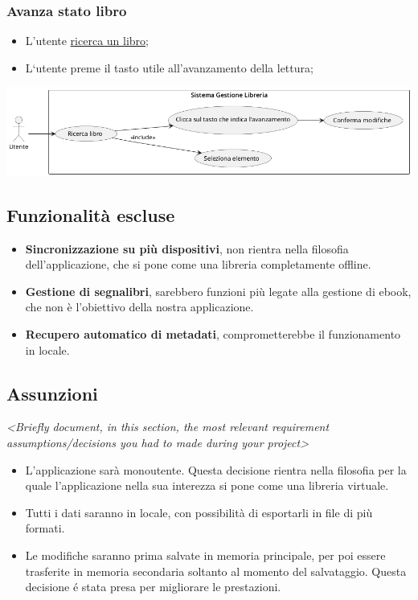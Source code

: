 \subsubsection{Avanza stato libro}
\begin{itemize}
  \item
    L'utente \underline{ricerca un libro};
  \item
    L`utente preme il tasto utile all'avanzamento della lettura;
\end{itemize}
\begin{center}
  \includegraphics[width=\textwidth]{media/useCase6.png}
\end{center}

\subsection{Funzionalità escluse}

\begin{itemize}
  \item
    \textbf{Sincronizzazione su più dispositivi}, non rientra nella filosofia dell'applicazione, che si pone come una libreria completamente offline.
  \item
    \textbf{Gestione di segnalibri}, sarebbero funzioni più legate alla gestione di ebook, che non è l'obiettivo della nostra applicazione.
  \item
    \textbf{Recupero automatico di metadati}, comprometterebbe il funzionamento in locale.
\end{itemize}

\subsection{Assunzioni}
\emph{\textless Briefly document, in this section, the most relevant
  requirement assumptions/decisions you had to made during your
project\textgreater{}}
\begin{itemize}
  \item L'applicazione sarà monoutente. Questa decisione rientra nella filosofia per la quale l'applicazione nella sua interezza si pone come una libreria virtuale.
  \item Tutti i dati saranno in locale, con possibilità di esportarli in file di più formati.
  \item Le modifiche saranno prima salvate in memoria principale, per poi essere trasferite in memoria secondaria soltanto al momento del salvataggio. Questa decisione é stata presa per migliorare le prestazioni.
  
\end{itemize}

